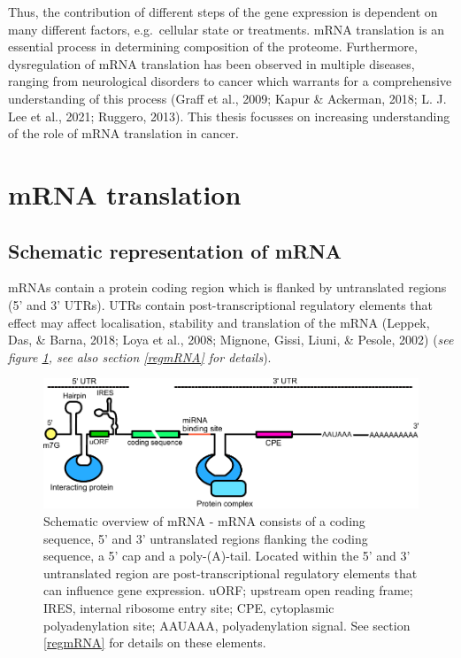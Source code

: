 \documentclass[12pt,openany]{book}
\begin{document}
Thus, the contribution of different steps of the gene expression is
dependent on many different factors, e.g.~cellular state or treatments.
mRNA translation is an essential process in determining composition of
the proteome. Furthermore, dysregulation of mRNA translation has been
observed in multiple diseases, ranging from neurological disorders to
cancer which warrants for a comprehensive understanding of this process
(Graff et al., 2009; Kapur \& Ackerman, 2018; L. J. Lee et al., 2021;
Ruggero, 2013). This thesis focusses on increasing understanding of the
role of mRNA translation in cancer. \newline
\section{mRNA translation} \subsection{Schematic representation of mRNA}
mRNAs contain a protein coding region which is flanked by untranslated
regions (5' and 3' UTRs). UTRs contain post-transcriptional regulatory
elements that effect may affect localisation, stability and translation
of the mRNA (Leppek, Das, \& Barna, 2018; Loya et al., 2008; Mignone,
Gissi, Liuni, \& Pesole, 2002) (\emph{see figure \ref{fig:UTRFeat}, see
also section \ref{regmRNA} for details}).

\begin{figure}[H]
  \includegraphics{./figures/UTRFeatures_2.pdf}
  \caption{ Schematic overview of mRNA - mRNA consists of a coding sequence, 5' and 3' untranslated regions flanking the coding sequence, a 5' cap and a poly-(A)-tail. Located within the 5' and 3' untranslated region are post-transcriptional regulatory elements that can influence gene expression. uORF; upstream open reading frame; IRES, internal ribosome entry site; CPE, cytoplasmic polyadenylation site; AAUAAA, polyadenylation signal. See section \ref{regmRNA} for details on these elements.
 \label{fig:UTRFeat}}
\end{figure}
\end{document}
